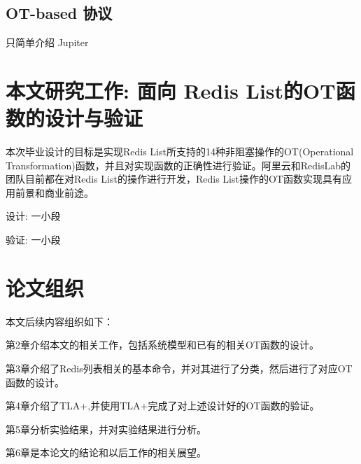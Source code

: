 \subsection{OT-based 协议}

只简单介绍 Jupiter

\section{本文研究工作: 面向 Redis List的OT函数的设计与验证}
	\par 本次毕业设计的目标是实现Redis List所支持的14种非阻塞操作的OT(Operational Transformation)函数，并且对实现函数的正确性进行验证。阿里云和RedisLab的团队目前都在对Redis List的操作进行开发，Redis List操作的OT函数实现具有应用前景和商业前途。

	设计: 一小段

	验证: 一小段
\section{论文组织}
	\par 本文后续内容组织如下：
	\par 第2章介绍本文的相关工作，包括系统模型和已有的相关OT函数的设计。
	\par 第3章介绍了Redis列表相关的基本命令，并对其进行了分类，然后进行了对应OT函数的设计。
	\par 第4章介绍了TLA+,并使用TLA+完成了对上述设计好的OT函数的验证。
	\par 第5章分析实验结果，并对实验结果进行分析。
	\par 第6章是本论文的结论和以后工作的相关展望。